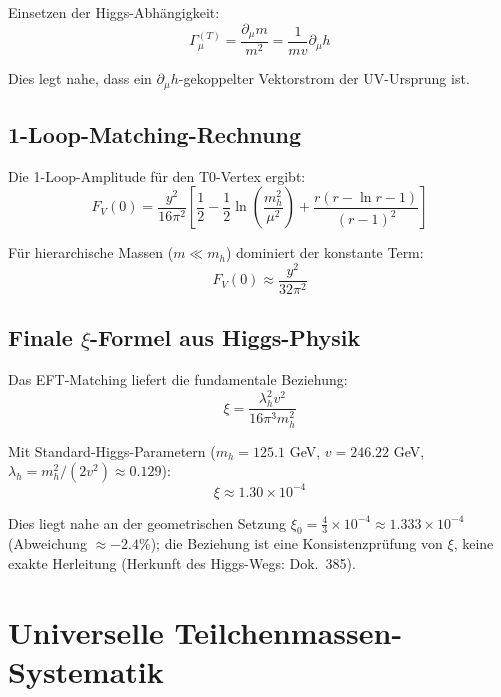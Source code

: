 	Einsetzen der Higgs-Abhängigkeit:
	\begin{equation}
		\Gamma_\mu^{(T)} = \frac{\partial_\mu m}{m^2} = \frac{1}{mv}\partial_\mu h
	\end{equation}
	
	Dies legt nahe, dass ein $\partial_\mu h$-gekoppelter Vektorstrom der UV-Ursprung ist.
	
	\subsection{1-Loop-Matching-Rechnung}
	\label{subsec:one_loop_matching}
	
	Die 1-Loop-Amplitude für den T0-Vertex ergibt:
	\begin{equation}
		F_V(0) = \frac{y^2}{16\pi^2}\left[\frac{1}{2} - \frac{1}{2}\ln\left(\frac{m_h^2}{\mu^2}\right) + \frac{r(r-\ln r-1)}{(r-1)^2}\right]
	\end{equation}
	
	Für hierarchische Massen ($m \ll m_h$) dominiert der konstante Term:
	\begin{equation}
		F_V(0) \approx \frac{y^2}{32\pi^2}
	\end{equation}
	
	\subsection{Finale $\xi$-Formel aus Higgs-Physik}
	\label{subsec:finale_xi_formel}
	
	Das EFT-Matching liefert die fundamentale Beziehung:
	\begin{equation}
		\boxed{\xi = \frac{\lambda_h^2 v^2}{16\pi^3 m_h^2}}
	\end{equation}
	
	Mit Standard-Higgs-Parametern ($m_h = 125.1$ GeV, $v = 246.22$ GeV, $\lambda_h = m_h^2/(2v^2) \approx 0.129$):
	\begin{equation}
		\xi \approx 1.30 \times 10^{-4}
	\end{equation}
	
	Dies liegt nahe an der geometrischen Setzung $\xi_0 = \frac{4}{3} \times 10^{-4} \approx 1.333 \times 10^{-4}$ (Abweichung $\approx -2.4\%$); die Beziehung ist eine Konsistenzprüfung von $\xi$, keine exakte Herleitung (Herkunft des Higgs-Wegs: Dok.~385).
	
	\section{Universelle Teilchenmassen-Systematik}
	\label{sec:universal_masses}
	
